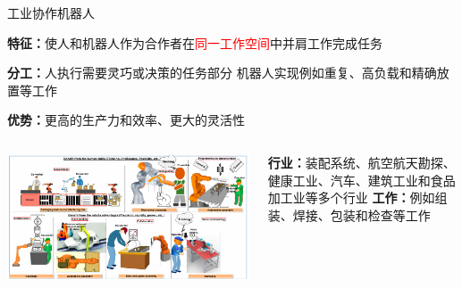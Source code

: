 \documentclass{beamer}
\newcounter{industry}
\begin{document}
\begin{frame}{工业协作机器人}

\setlength{\leftmargini}{0mm}
\begin{itemize}
\scriptsize{
\item \textbf{特征：}使人和机器人作为合作者在\textcolor{red}{同一工作空间}中并肩工作完成任务
\item \textbf{分工：}人执行需要灵巧或决策的任务部分
\newline{}机器人实现例如重复、高负载和精确放置等工作
\item \textbf{优势：}更高的生产力和效率、更大的灵活性
}\end{itemize}

\begin{columns}[c]
\begin{column}{0.7\textwidth}
\centering
\includegraphics[width=\linewidth]{industry/1.png}
\tiny{}
\end{column}
\begin{column}{0.3\textwidth}
\scriptsize{\textbf{行业：}装配系统、航空航天勘探、健康工业、汽车、建筑工业和食品加工业等多个行业
\newline\textbf{工作：}例如组装、焊接、包装和检查等工作
}\end{column}
\end{columns}
\end{frame}
\end{document}
